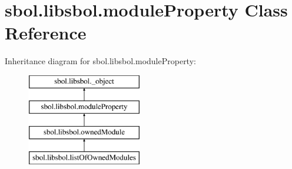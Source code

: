\hypertarget{classsbol_1_1libsbol_1_1module_property}{}\section{sbol.\+libsbol.\+module\+Property Class Reference}
\label{classsbol_1_1libsbol_1_1module_property}
Inheritance diagram for sbol.\+libsbol.\+module\+Property\+:\begin{figure}[H]
\begin{center}
\leavevmode
\includegraphics[height=4.000000cm]{classsbol_1_1libsbol_1_1module_property}
\end{center}
\end{figure}
